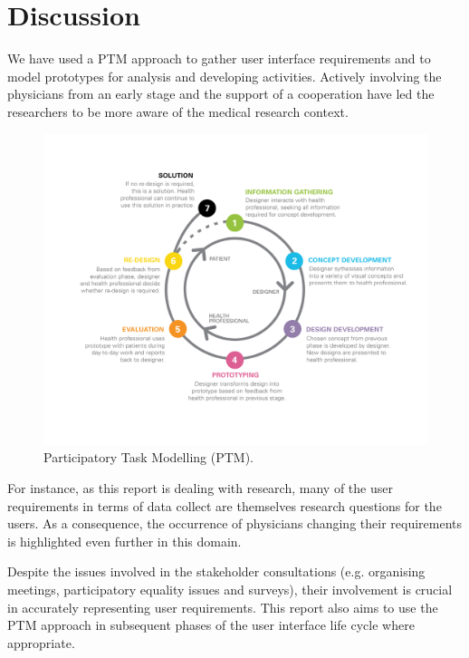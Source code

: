 \clearpage

\section{Discussion}

We have used a PTM \cite{keungparticipatory} approach to gather user interface requirements and to model prototypes for analysis and developing activities. Actively involving the physicians from an early stage and the support of a cooperation have led the researchers to be more aware of the medical research context.

\begin{figure}[!hbt]
\centering
\includegraphics[width=1.00\textwidth]{ptm.png}
\caption{\label{fig:PTM}Participatory Task Modelling (PTM).
}
\end{figure}

For instance, as this report is dealing with research, many of the user requirements in terms of data collect are themselves research questions for the users. As a consequence, the occurrence of physicians changing their requirements is highlighted even further in this domain.

\clearpage

Despite the issues involved in the stakeholder consultations (e.g. organising meetings, participatory equality issues and surveys), their involvement is crucial in accurately representing user requirements. This report also aims to use the PTM approach in subsequent phases of the user interface life cycle where appropriate.

